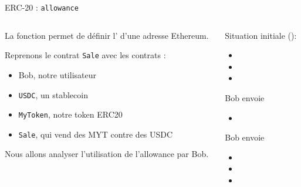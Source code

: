 \begin{frame}[fragile]{ERC-20 : \texttt{allowance}}
  \begin{columns}
    \begin{column}{0.4\textwidth}
      La fonction  permet de définir l' d'une adresse Ethereum.

      Reprenons le contrat \texttt{Sale} avec les contrats :

      \begin{itemize}
        \item Bob, notre utilisateur
        \item \texttt{USDC}, un stablecoin
        \item \texttt{MyToken}, notre token ERC20
        \item \texttt{Sale}, qui vend des MYT contre des USDC
      \end{itemize}

      Nous allons analyser l'utilisation de l'allowance par Bob.
    \end{column}

    \begin{column}{0.57\textwidth}
      Situation initiale ():

      \begin{itemize}
        \item {}
        \item {}
        \item {}
      \end{itemize}

      Bob envoie 
      \begin{itemize}
        \item {}
      \end{itemize}

      Bob envoie 
      \begin{itemize}
        \item {}
        \item {}
        \item {}
      \end{itemize}
    \end{column}
  \end{columns}
\end{frame}

